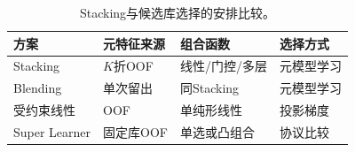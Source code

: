 \begin{table}[htbp]
  \centering
  \small
  \begin{tabularx}{\linewidth}{@{}>{\RaggedRight\arraybackslash}p{24mm}>{\RaggedRight\arraybackslash}X>{\RaggedRight\arraybackslash}X>{\RaggedRight\arraybackslash}X@{}}
    \toprule
    方案 & 元特征来源 & 组合函数 & 选择方式\\
    \midrule
    Stacking & $K$折OOF & 线性/门控/多层 & 元模型学习\\
    Blending & 单次留出 & 同Stacking & 元模型学习\\
    受约束线性 & OOF & 单纯形线性 & 投影梯度\\
    Super Learner & 固定库OOF & 单选或凸组合 & 协议比较\\
    \bottomrule
  \end{tabularx}
  \caption{Stacking与候选库选择的安排比较。}
  \label{tab:ensemble-stacking-comparison}
\end{table}
